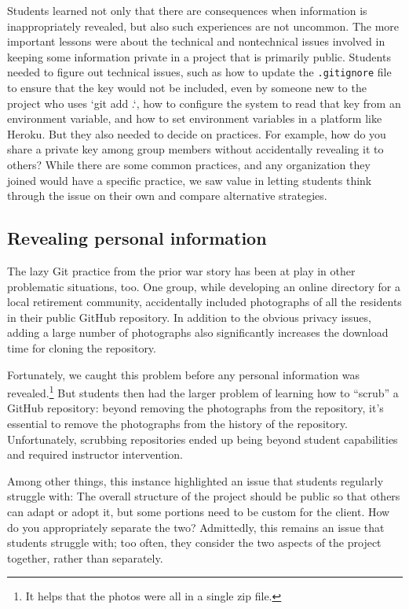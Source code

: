 Students learned not only that there are consequences when
information is inappropriately revealed, but also such experiences
are not uncommon.
The more important lessons were about the
technical and nontechnical issues involved in keeping some information
private in a project that is primarily public.
Students needed to figure out technical issues, such as how
to update the \texttt{.gitignore} file to ensure that the key would
not be included, even by someone new to the project who uses `git
add .`, how to configure the system to read that key from an
environment variable, and how to set environment variables in a
platform like Heroku.  But they also needed to decide on practices.
For example, how do you share a private key among group members without
accidentally revealing it to others?  While there are some common practices,
and any organization they joined would have a specific practice, we saw
value in letting students think through the issue on their own and
compare alternative strategies.

\subsection{Revealing personal information}

The lazy Git practice from the prior war story has been at play
in other problematic situations, too.  One group, while developing
an online directory for a local retirement community, accidentally
included photographs of all the residents in their public GitHub
repository.  In addition to the obvious privacy issues, adding a
large number of photographs also significantly increases the download
time for cloning the repository.

Fortunately, we caught this problem before any
personal information was revealed.\footnote{It helps that the photos
were all in a single zip file.}  But students then had the larger
problem of learning how to ``scrub'' a GitHub repository: beyond
removing the photographs from the repository, it's
essential to remove the photographs from the history of the
repository.  Unfortunately, scrubbing repositories ended up being
beyond student capabilities and required instructor intervention.

Among other things, this instance highlighted an issue that students
regularly struggle with: The overall structure of the project should
be public so that others can adapt or adopt it, but some portions
need to be custom for the client.  How do you appropriately separate the
two?  Admittedly, this remains an issue that students struggle with;
too often, they consider the two aspects of the project together,
rather than separately.


